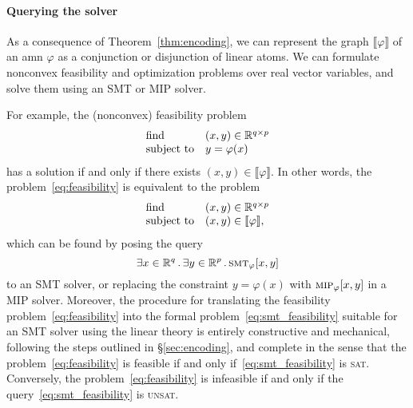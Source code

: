 \documentclass[10pt]{article}
\newcommand{\amn}{\varphi}
\newcommand{\Graph}[1]{\llbracket #1 \rrbracket}
\newcommand{\smt}{\mbox{\sc smt}}
\newcommand{\mip}{\mbox{\sc mip}}
\theoremstyle{remark}
\theoremstyle{definition}
\theoremstyle{plain}
\begin{document}
\paragraph{Querying the solver}
As a consequence of Theorem~\ref{thm:encoding}, we can represent the graph
$\Graph{\amn}$ of an \acs{amn} $\amn$ as a conjunction or disjunction of linear
atoms. We can formulate nonconvex feasibility and optimization problems over
real vector variables, and solve them using an SMT or MIP solver. 

For example, the (nonconvex) feasibility problem 
\begin{equation}
	\label{eq:feasibility}
	\begin{array}{ll}
		\mbox{find}   & (x,y)\in\reals^{q\times p} \\
		\mbox{subject to} & y = \amn(x)
	\end{array}
\end{equation}
has a solution if and only if there exists $(x,y)\in\Graph{\amn}$. 
In other words, the problem~\eqref{eq:feasibility} is equivalent to the problem
\begin{equation*}
	\label{eq:feasibility2}
	\begin{array}{ll}
		\mbox{find}   & (x,y)\in\reals^{q\times p} \\
		\mbox{subject to} & (x,y) \in \Graph{\amn},
	\end{array}
\end{equation*}
which can be found by posing the query
\begin{equation}
	\label{eq:smt_feasibility}
	\exists x \in \reals^q \, . \,
	\exists y \in \reals^p \, . \,
	\smt_\amn[x,y]
\end{equation}
to an SMT solver, or replacing the constraint $y=\amn(x)$ with $\mip_\amn[x,y]$
in a MIP solver. Moreover, the procedure for translating the feasibility
problem~\eqref{eq:feasibility} into the formal
problem~\eqref{eq:smt_feasibility} suitable for an SMT solver using the linear
theory is entirely constructive and mechanical, following the steps outlined in
\S{\ref{sec:encoding}}, and complete in the sense that the
problem~\eqref{eq:feasibility} is feasible if and only
if~\eqref{eq:smt_feasibility} is \textsc{sat}. Conversely, the
problem~\eqref{eq:feasibility} is infeasible if and only if the
query~\eqref{eq:smt_feasibility} is \textsc{unsat}.
\end{document}
